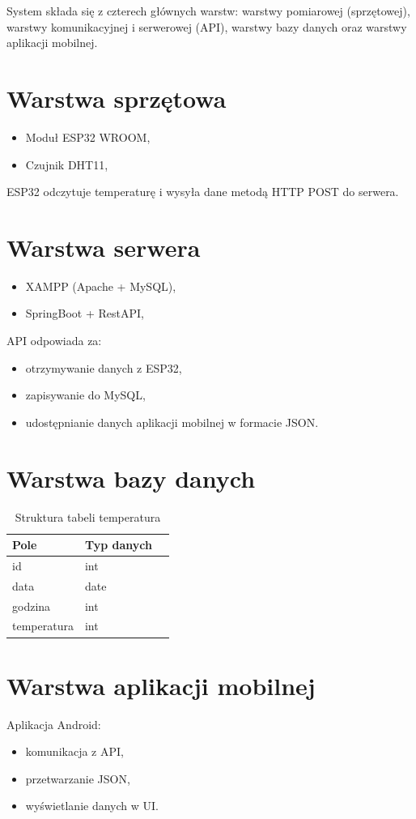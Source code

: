 System składa się z czterech głównych warstw: warstwy pomiarowej (sprzętowej), warstwy komunikacyjnej i serwerowej (API), warstwy bazy danych oraz warstwy aplikacji mobilnej.

\section{Warstwa sprzętowa}
\begin{itemize}
    \item Moduł ESP32 WROOM,
    \item Czujnik DHT11,
\end{itemize}

ESP32 odczytuje temperaturę i wysyła dane metodą HTTP POST do serwera.

\section{Warstwa serwera}
\begin{itemize}
    \item XAMPP (Apache + MySQL),
    \item SpringBoot + RestAPI,
\end{itemize}

API odpowiada za:
\begin{itemize}
    \item otrzymywanie danych z ESP32,
    \item zapisywanie do MySQL,
    \item udostępnianie danych aplikacji mobilnej w formacie JSON.
\end{itemize}

\section{Warstwa bazy danych}
\begin{table}[ht!]
\centering
\caption{Struktura tabeli temperatura}
\label{tab:przyklad}
\begin{tabular}{lll}
\toprule
Pole        & Typ danych \\  
\midrule
id          & int \\
data        & date \\ 
godzina     & int \\
temperatura & int \\
\bottomrule 
\end{tabular}
\end{table}

\section{Warstwa aplikacji mobilnej}
Aplikacja Android:
\begin{itemize}
    \item komunikacja z API,
    \item przetwarzanie JSON,
    \item wyświetlanie danych w UI.
\end{itemize}